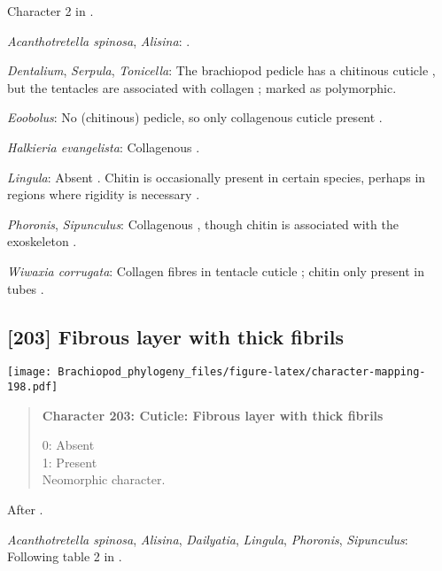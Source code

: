\documentclass[openany]{book}
\theoremstyle{definition}
\theoremstyle{definition}
\theoremstyle{definition}
\theoremstyle{remark}
\begin{document}
Character 2 in \citet{Haszprunar2008}.

\hypertarget{Acanthotretella_spinosa-coding-202}{}
\emph{Acanthotretella spinosa}, \emph{Alisina}: \citet{Haszprunar2008}.

\hypertarget{Dentalium-coding-202}{}
\emph{Dentalium}, \emph{Serpula}, \emph{Tonicella}: The brachiopod
pedicle has a chitinous cuticle
\citep{Williams1997Introduction, MacKay1978}, but the tentacles are
associated with collagen \citep{Williams1997Introduction}; marked as
polymorphic.

\hypertarget{Eoobolus-coding-202}{}
\emph{Eoobolus}: No (chitinous) pedicle, so only collagenous cuticle
present \citep{Williams1997Introduction}.

\hypertarget{Halkieria_evangelista-coding-202}{}
\emph{Halkieria evangelista}: Collagenous \citep{Goffinet1978}.

\hypertarget{Lingula-coding-202}{}
\emph{Lingula}: Absent \citep{Haszprunar2008}. Chitin is occasionally
present in certain species, perhaps in regions where rigidity is
necessary \citep{Borisanova2015}.

\hypertarget{Phoronis-coding-202}{}
\emph{Phoronis}, \emph{Sipunculus}: Collagenous \citep{Schopf1967},
though chitin is associated with the exoskeleton \citep{Hunt1972}.

\hypertarget{Wiwaxia_corrugata-coding-202}{}
\emph{Wiwaxia corrugata}: Collagen fibres in tentacle cuticle
\citep{Bartolomaeus2001U}; chitin only present in tubes
\citep{Jeuniaux1971}.

\subsection*{{[}203{]} Fibrous layer with thick
fibrils}\label{fibrous-layer-with-thick-fibrils}

\texttt{[image: Brachiopod\_phylogeny\_files/figure-latex/character-mapping-198.pdf]}

\begin{quote}
\textbf{Character 203: Cuticle: Fibrous layer with thick fibrils}

0: Absent\\
1: Present\\
Neomorphic character.
\end{quote}

After \citet{Borisanova2015}.

\hypertarget{Acanthotretella_spinosa-coding-203}{}
\emph{Acanthotretella spinosa}, \emph{Alisina}, \emph{Dailyatia},
\emph{Lingula}, \emph{Phoronis}, \emph{Sipunculus}: Following table 2 in
\citet{Borisanova2015}.
\end{document}
